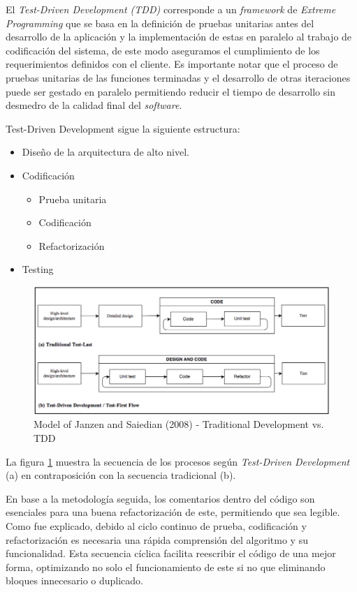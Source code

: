 El \emph{Test-Driven Development (TDD)} corresponde a un \emph{framework} de \emph{Extreme Programming} que se basa en la definición de pruebas unitarias antes del desarrollo de la aplicación y la implementación de estas en paralelo al trabajo de codificación del sistema, de este modo aseguramos el cumplimiento de los requerimientos definidos con el cliente. Es importante notar que el proceso de pruebas unitarias de las funciones terminadas y el desarrollo de otras iteraciones puede ser gestado en paralelo permitiendo reducir el tiempo de desarrollo sin desmedro de la calidad final del \emph{software}. 

Test-Driven Development sigue la siguiente estructura:
\begin{itemize}
	\item Diseño de la arquitectura de alto nivel.
	\item Codificación
		\begin{itemize}
		\item Prueba unitaria
		\item Codificación
		\item Refactorización
		\end{itemize}
	\item Testing
\end{itemize}

\begin{figure}[ht!]
\centering
\includegraphics[width=1\textwidth]{figures/mapa-tdd.png}
\caption{Model of Janzen and Saiedian (2008) - Traditional Development vs. TDD}
\label{fig:Traditional Development vs. TDD}
\end{figure}

La figura \ref{fig:Traditional Development vs. TDD} muestra la secuencia de los procesos según \emph{Test-Driven Development} (a) en contraposición con la secuencia tradicional (b).

En base a la metodología seguida, los comentarios dentro del código son esenciales para una buena refactorización de este, permitiendo que sea legible. Como fue explicado, debido al ciclo continuo de prueba, codificación y refactorización es necesaria una rápida comprensión del algoritmo y su funcionalidad. Esta secuencia cíclica facilita reescribir el código de una mejor forma, optimizando no solo el funcionamiento de este si no que eliminando bloques innecesario o duplicado.

